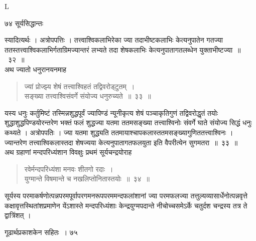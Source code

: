 \documentclass[11pt, openany]{book}
\begin{document}
{\tiny{L}}

\newpage

\noindent ७४ \hspace{4cm} सूर्यसिद्धान्तः
\vspace{1cm}

\begin{sloppypar}
\noindent स्यादित्यर्थः । अत्रोपपत्तिः । तत्त्वाश्विकलाभिरेका ज्या तदाभीष्टकलाभिः केत्यनुपातेन गतज्या ततस्तत्त्वाश्विकलाभिर्गताग्रिमज्यान्तरं लभ्यते तदा शेषकलाभिः केत्यनुपातागतलब्धेन युक्ताभीष्टज्या~॥~३२~॥\\
\noindent अथ ज्यातो धनुरानयनमाह\textendash
\end{sloppypar}
\begin{quote}

{\ssi ज्यां प्रोज्झ्य शेषं तत्त्वाश्विहतं तद्विवरोड्टुतम्~।\\
सङ्ख्या तत्त्वाश्विसंवर्गे संयोज्य धनुरुच्यते~॥~३३~॥}
\end{quote}
\begin{sloppypar}
यस्य धनुः कर्तुमिष्टं तस्मिन्नशुद्धपूर्वं ज्यापिण्डं न्यूनीकृत्य शेषं पञ्चाकृतिगुणं तद्विवरोद्धृतं तयोः शुद्धाशुद्धपिण्डयोरन्तरेण भक्तं फलं शुद्धज्या यतमा ततमसङ्ख्या तत्त्वाश्विनोः संवर्गे घाते संयोज्य सिद्धं धनुः कथ्यते । अत्रोपपतिः । ज्या यतमा शुद्ध्यति ततमायाश्चापकलास्ततमसङ्ख्यागुणिततत्त्वाश्विनः । ज्यान्तरेण तत्त्वाश्विकलास्तदा शेषज्यया केत्यनुपातागतफलयुता इति वैपरीत्येन सुगमतरा~॥~३३~॥\\
\noindent अथ ग्रहाणां मन्दपरिध्यंशान विवक्षुः प्रथमं सूर्यचन्द्रयोराह\textendash
\end{sloppypar}
\begin{quote}

{\ssi रवेर्मन्दपरिध्यंशा मनवः शीतगो रदाः~।\\
युग्मान्ते विषमान्ते च नखलिप्तोनितास्तयोः~॥~३४~॥}
\end{quote}
\begin{sloppypar}
सूर्यस्य परमाकर्षणोत्पन्नपरमपूर्वापरगमनरूपपरममन्दफलांशानां ज्या परमफलज्या तत्तुल्यव्यासार्धेनोत्पन्नवृत्ते कक्षावृत्तस्थितांशप्रमाणेन येंऽशास्ते मन्दपरिध्यंशाः केन्द्रयुग्मपदान्ते नीचोच्चसमेऽर्के चतुर्दश चन्द्रस्य तत्र ते द्वात्रिंशत् ।
\end{sloppypar}

\newpage

\hspace{3cm}गूढार्थप्रकाशकेन सहितः~। \hfill ७५
\vspace{1cm}
\end{document}
